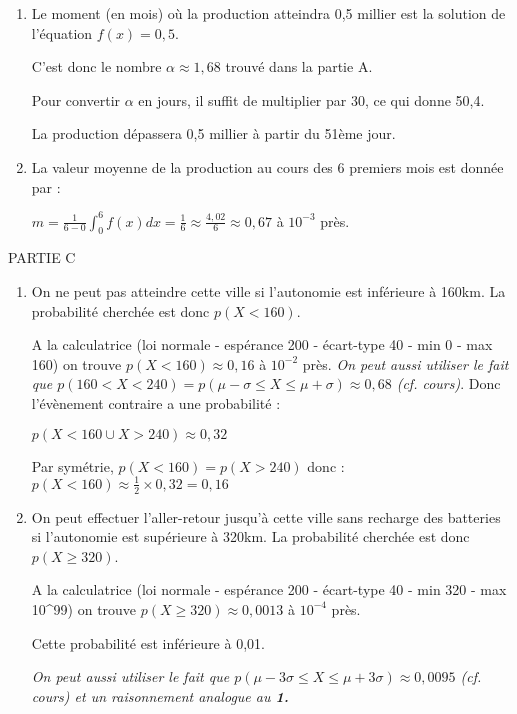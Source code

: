 \begin{corrige}
     \begin{enumerate}
          \item
          Le moment (en mois) où la production atteindra 0,5 millier est la solution de l'équation $f\left(x\right)=0,5$.
          \par
          C'est donc le nombre $\alpha  \approx 1,68$ trouvé dans la partie A.
          \par
          Pour convertir $\alpha $ en jours, il suffit de multiplier par 30, ce qui donne 50,4.
          \par
          La production dépassera 0,5 millier à partir du 51ème jour.
          \item
          La valeur moyenne de la production au cours des 6 premiers mois est donnée par :
          \par
          $m=\frac{1}{6-0}\int_{0}^{6}f\left(x\right)dx=\frac{1}{6}\approx \frac{4,02}{6}\approx 0,67$ à $10^{-3}$ près.
     \end{enumerate}
     \begin{h3}
     PARTIE C\end{h3}
     \begin{enumerate}
          \item
          On ne peut pas atteindre cette ville si l'autonomie est inférieure à 160km. La probabilité cherchée est donc $p\left(X < 160\right)$.
          \par
          A la calculatrice (loi normale - espérance 200 - écart-type 40 - min 0  - max 160) on trouve $p\left(X < 160\right)\approx 0,16$ à $10^{-2}$ près.
          \textit{On peut aussi utiliser le fait que $p\left(160 < X < 240\right)=p\left(\mu -\sigma \leqslant X\leqslant \mu +\sigma \right)\approx 0,68$ (cf. cours)}. Donc l'évènement contraire a une probabilité :
          \par
          $p\left(X < 160 \cup X > 240\right)\approx 0,32$
          \par
          Par symétrie, $p\left(X < 160\right)=p\left(X > 240\right)$ donc : $p\left(X < 160\right)\approx \frac{1}{2}\times 0,32=0,16$
          \item
          On peut effectuer l'aller-retour jusqu'à cette ville sans recharge des batteries si l'autonomie est supérieure à 320km. La probabilité cherchée est donc $p\left(X\geqslant 320\right)$.
          \par
          A la calculatrice (loi normale - espérance 200 - écart-type 40 - min 320 - max 10^99) on trouve $p\left(X\geqslant 320\right)\approx 0,0013$ à $10^{-4}$ près.
          \par
          Cette probabilité est inférieure à 0,01.
\par
          \textit{On peut aussi utiliser le fait que $p\left(\mu -3\sigma \leqslant X \leqslant \mu +3 \sigma \right)\approx 0,0095$ (cf. cours) et un raisonnement analogue au \textbf{1.}
          }
     \end{enumerate}
\end{corrige}
